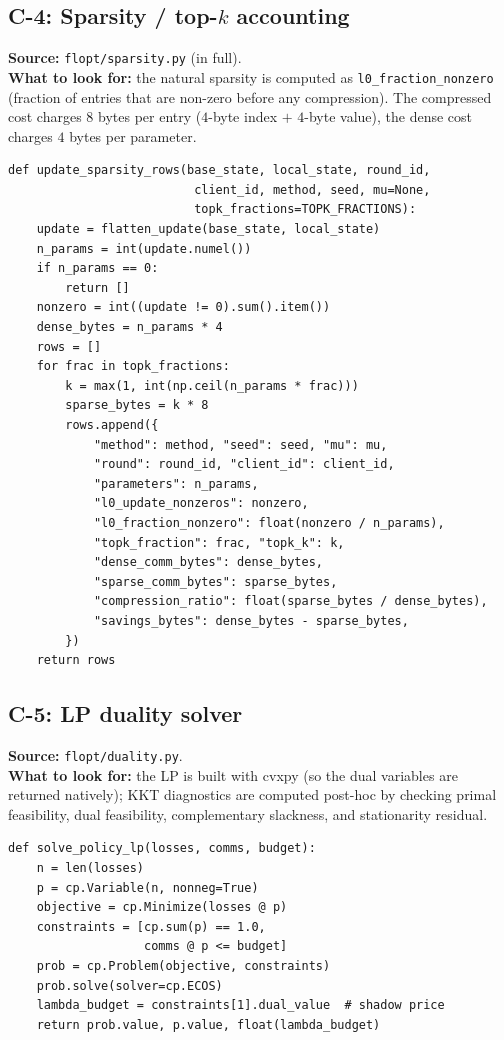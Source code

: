 \subsection{C-4: Sparsity / top-$k$ accounting}
\textbf{Source:} \texttt{flopt/sparsity.py} (in full).\\
\textbf{What to look for:} the natural sparsity is computed as
\texttt{l0\_fraction\_nonzero} (fraction of entries that are
non-zero before any compression). The compressed cost charges
$8$ bytes per entry ($4$-byte index $+$ $4$-byte value), the dense
cost charges $4$ bytes per parameter.

\begin{lstlisting}
def update_sparsity_rows(base_state, local_state, round_id,
                          client_id, method, seed, mu=None,
                          topk_fractions=TOPK_FRACTIONS):
    update = flatten_update(base_state, local_state)
    n_params = int(update.numel())
    if n_params == 0:
        return []
    nonzero = int((update != 0).sum().item())
    dense_bytes = n_params * 4
    rows = []
    for frac in topk_fractions:
        k = max(1, int(np.ceil(n_params * frac)))
        sparse_bytes = k * 8
        rows.append({
            "method": method, "seed": seed, "mu": mu,
            "round": round_id, "client_id": client_id,
            "parameters": n_params,
            "l0_update_nonzeros": nonzero,
            "l0_fraction_nonzero": float(nonzero / n_params),
            "topk_fraction": frac, "topk_k": k,
            "dense_comm_bytes": dense_bytes,
            "sparse_comm_bytes": sparse_bytes,
            "compression_ratio": float(sparse_bytes / dense_bytes),
            "savings_bytes": dense_bytes - sparse_bytes,
        })
    return rows
\end{lstlisting}

\subsection{C-5: LP duality solver}
\textbf{Source:} \texttt{flopt/duality.py}.\\
\textbf{What to look for:} the LP is built with cvxpy (so the dual
variables are returned natively); KKT diagnostics are computed
post-hoc by checking primal feasibility, dual feasibility,
complementary slackness, and stationarity residual.

\begin{lstlisting}
def solve_policy_lp(losses, comms, budget):
    n = len(losses)
    p = cp.Variable(n, nonneg=True)
    objective = cp.Minimize(losses @ p)
    constraints = [cp.sum(p) == 1.0,
                   comms @ p <= budget]
    prob = cp.Problem(objective, constraints)
    prob.solve(solver=cp.ECOS)
    lambda_budget = constraints[1].dual_value  # shadow price
    return prob.value, p.value, float(lambda_budget)
\end{lstlisting}

